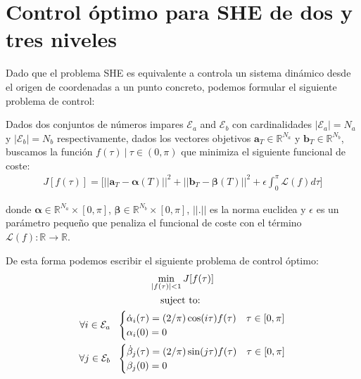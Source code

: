 
\section{Control óptimo para SHE de dos y tres niveles}

Dado que el problema SHE es equivalente a controla un sistema dinámico desde el origen de coordenadas a un punto concreto, podemos formular el siguiente problema de control:
\begin{problem}\label{OCP1}
    Dados dos conjuntos de números impares $\mathcal{E}_a$ and $\mathcal{E}_b$ con cardinalidades $|\mathcal{E}_a| = N_a$ y  $|\mathcal{E}_b| = N_b$ respectivamente, dados los vectores objetivos $\bm{a}_T  \in \mathbb{R}^{N_a}$ y $\bm{b}_T  \in \mathbb{R}^{N_b}$, buscamos la función  $f(\tau ) \ | \ \tau \in (0,\pi)$ que minimiza el siguiente funcional de coste:
        \begin{gather}
        J[f(\tau)] = \Bigg[ || \bm{a}_T - \bm{\alpha}(T)||^2 + || \bm{b}_T - \bm{\beta}(T)||^2 
        + \epsilon \int_0^{\pi} \mathcal{L}(f) d\tau \Bigg] 
    \end{gather}

    donde  $\bm{\alpha} \in \mathbb{R}^{N_a} \times [0,\pi]$, $\bm{\beta} \in \mathbb{R}^{N_b}  \times [0,\pi]$,  $||.||$ es la norma euclidea y $\epsilon$ es un parámetro pequeño que penaliza el funcional de coste con el término $\mathcal{L}(f):\mathbb{R} \rightarrow \mathbb{R}$. 
    \newline

    De esta forma podemos escribir el siguiente problema de control óptimo:
    \begin{gather}
        \min_{|f(\tau) |<1} J[f(\tau)] \\
        \notag \text{suject to: } \\
        \notag \forall i \in \mathcal{E}_a\ \ 
        \begin{cases}
            \dot{\alpha}_i(\tau) = (2/\pi) \cos(i\tau) f(\tau) & \tau \in [0,\pi]\label{dyn}\\
            \alpha_i(0) = 0
        \end{cases} \\
        \notag \forall j \in \mathcal{E}_b\ \ 
        \begin{cases}
            \dot{\beta}_j(\tau) = (2/\pi) \sin(j\tau) f(\tau) & \tau \in [0,\pi]\label{dyn}\\
            \beta_j(0) = 0
        \end{cases} 
    \end{gather}
\end{problem}

